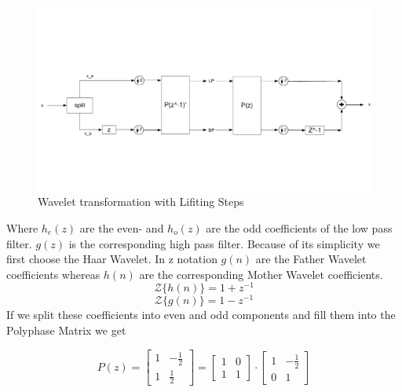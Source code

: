 \begin{refsection}
\begin{figure}
	\centering
	\includegraphics[width=\textwidth]{./images/lifting_step_wavelet.pdf}
	\caption{Wavelet transformation with Lifiting Steps \label{fpga:lstp_wavelet}}
\end{figure}
Where $h_e(z)$ are the even- and $h_o(z)$ are the odd coefficients of the low pass filter.
$g(z)$ is the corresponding high pass filter. 
Because of its simplicity we first choose the Haar Wavelet.
In z notation $g(n)$ are the Father Wavelet coefficients whereas $h(n)$ are the corresponding Mother Wavelet coefficients. 
\begin{equation}
{\mathcal {Z}} \{h(n)\} = 1 + z^{-1}
\end{equation}
\begin{equation}
{\mathcal {Z}} \{g(n)\} = 1 - z^{-1}
\end{equation}
If we split these coefficients into even and odd components and fill them into the Polyphase Matrix we get 

\begin{equation*}
P(z) =
\begin{bmatrix}
1 & -\frac{1}{2} \\
1 & \frac{1}{2}
\end{bmatrix}
 = 
 \begin{bmatrix}
 1 & 0 \\
 1 & 1
 \end{bmatrix}
 \cdot
 \begin{bmatrix}
 1 & -\frac{1}{2} \\
 0 & 1
 \end{bmatrix}
\end{equation*}


\end{refsection}

